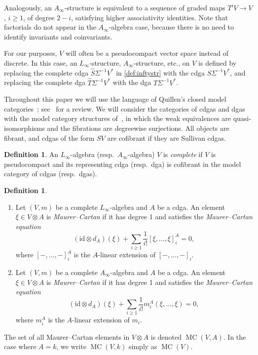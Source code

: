 \documentclass[a4paper,reqno]{amsart}
\theoremstyle{plain}
\theoremstyle{definition}
\newtheorem{defn}[thm]{Definition}
\theoremstyle{remark}
\newcommand{\id}{\mathrm{id}}
\DeclareMathOperator{\MC}{MC}
\begin{document}
Analogously, an $A_{\infty}$-structure is equivalent to a sequence of graded maps $T^i V \to V$, $i \geq 1$, of degree $2-i$, satisfying higher associativity identities.
Note that factorials do not appear in the $A_{\infty}$-algebra case, because there is no need to identify invariants and coinvariants.

For our purposes, $V$ will often be a pseudocompact vector space instead of discrete. 
In this case, an $L_{\infty}$-structure, $A_{\infty}$-structure, etc., on $V$ is defined by replacing the complete cdga $\widehat{S}\Sigma^{-1}V^*$ in \cref{def:inftystr} with the cdga $S\Sigma^{-1}V^*$, and replacing the complete dga $\widehat{T}\Sigma^{-1}V^*$ with the dga $T\Sigma^{-1}V^*$.

Throughout this paper we will use the language of Quillen's closed model categories~\cite{qui69}; see~\cite{ds95} for a review. 
We will consider the categories of cdgas and dgas with the model category structures of~\cite{hin97}, in which the weak equivalences are quasi-isomorphisms and the fibrations are degreewise surjections. 
All objects are fibrant, and cdgas of the form $SV$ are cofibrant if they are Sullivan cdgas.

\begin{defn} 
  An $L_{\infty}$-algebra (resp.~$A_{\infty}$-algebra)\/ $V$ is \emph{complete} if $V$ is pseudocompact and its representing cdga (resp.~dga) is cofibrant in the model category of cdgas (resp.~dgas).
\end{defn}

\begin{defn}\hfill
  \begin{enumerate}
    \item Let $(V,m)$ be a complete $L_{\infty}$-algebra and $A$ be a cdga.
      An element $\xi \in V \otimes A$ is \emph{Maurer--Cartan} if it has degree 1 and satisfies the \emph{Maurer--Cartan equation}
      \[
        (\id \otimes d_A)(\xi) + \sum_{i \geq 1} \frac{1}{i!} [\xi,\dots,\xi]^A_i = 0,
      \]
      where $[-,\dots,-]_i^A$ is the $A$-linear extension of $[-,\dots,-]_i$.

    \item Let $(V,m)$ be a complete $A_{\infty}$-algebra and $A$ be a cdga.
      An element $\xi \in V \otimes A$ is \emph{Maurer--Cartan} if it has degree 1 and satisfies the \emph{Maurer--Cartan equation}
      \[
        (\id \otimes d_A)(\xi) + \sum_{i \geq 1} \frac{1}{i!} m_i^A(\xi,\dots,\xi) = 0,
      \]
      where $m_i^A$ is the $A$-linear extension of $m_i$.
  \end{enumerate} 
  The set of all Maurer--Cartan elements in $V \otimes A$ is denoted $\MC(V,A)$.
  In the case where $A=k$, we write $\MC(V,k)$ simply as $\MC(V)$.
\end{defn}
\end{document}
